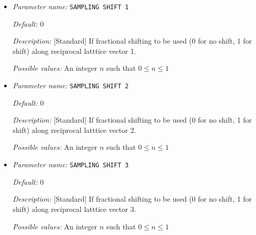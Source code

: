 \begin{itemize}


{\it Default:} 1


{\it Description:} [Standard] Number of Monkhorst-Pack grid points to be used along reciprocal latttice vector 3.


{\it Possible values:} An integer $n$ such that $1\leq n \leq 1000$
\item {\it Parameter name:} {\tt SAMPLING SHIFT 1}
\label{parameters:Brillouin zone k point sampling options/Monkhorst_2dPack _28MP_29 grid generation/SAMPLING SHIFT 1}
\label{parameters:Brillouin_20zone_20k_20point_20sampling_20options/Monkhorst_2dPack_20_28MP_29_20grid_20generation/SAMPLING_20SHIFT_201}




{\it Default:} 0


{\it Description:} [Standard] If fractional shifting to be used (0 for no shift, 1 for shift) along reciprocal latttice vector 1.


{\it Possible values:} An integer $n$ such that $0\leq n \leq 1$
\item {\it Parameter name:} {\tt SAMPLING SHIFT 2}
\label{parameters:Brillouin zone k point sampling options/Monkhorst_2dPack _28MP_29 grid generation/SAMPLING SHIFT 2}
\label{parameters:Brillouin_20zone_20k_20point_20sampling_20options/Monkhorst_2dPack_20_28MP_29_20grid_20generation/SAMPLING_20SHIFT_202}




{\it Default:} 0


{\it Description:} [Standard] If fractional shifting to be used (0 for no shift, 1 for shift) along reciprocal latttice vector 2.


{\it Possible values:} An integer $n$ such that $0\leq n \leq 1$
\item {\it Parameter name:} {\tt SAMPLING SHIFT 3}
\label{parameters:Brillouin zone k point sampling options/Monkhorst_2dPack _28MP_29 grid generation/SAMPLING SHIFT 3}
\label{parameters:Brillouin_20zone_20k_20point_20sampling_20options/Monkhorst_2dPack_20_28MP_29_20grid_20generation/SAMPLING_20SHIFT_203}




{\it Default:} 0


{\it Description:} [Standard] If fractional shifting to be used (0 for no shift, 1 for shift) along reciprocal latttice vector 3.


{\it Possible values:} An integer $n$ such that $0\leq n \leq 1$
\end{itemize}

